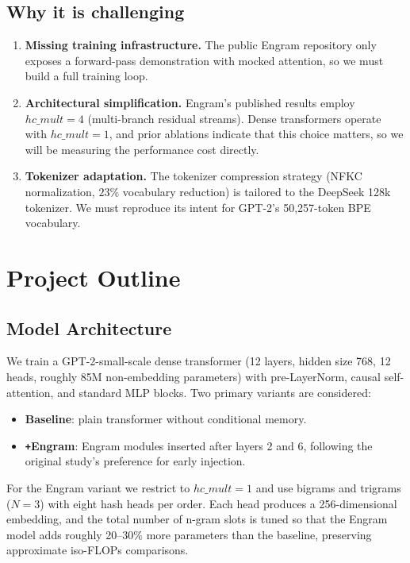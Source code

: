 \documentclass[11pt]{article}
\begin{document}
\subsection{Why it is challenging}
\begin{enumerate}
    \item \textbf{Missing training infrastructure.} The public Engram repository only exposes a forward-pass demonstration with mocked attention, so we must build a full training loop.
    \item \textbf{Architectural simplification.} Engram's published results employ $hc\_mult = 4$ (multi-branch residual streams). Dense transformers operate with $hc\_mult = 1$, and prior ablations indicate that this choice matters, so we will be measuring the performance cost directly.
    \item \textbf{Tokenizer adaptation.} The tokenizer compression strategy (NFKC normalization, $23\%$ vocabulary reduction) is tailored to the DeepSeek 128k tokenizer. We must reproduce its intent for GPT-2's 50{,}257-token BPE vocabulary.
\end{enumerate}

\section{Project Outline}
\subsection{Model Architecture}
We train a GPT-2-small-scale dense transformer (12 layers, hidden size 768, 12 heads, roughly 85M non-embedding parameters) with pre-LayerNorm, causal self-attention, and standard MLP blocks. Two primary variants are considered:
\begin{itemize}
    \item \textbf{Baseline}: plain transformer without conditional memory.
    \item \textbf{\texttt{+}Engram}: Engram modules inserted after layers 2 and 6, following the original study's preference for early injection.
\end{itemize}

For the Engram variant we restrict to $hc\_mult = 1$ and use bigrams and trigrams ($N=3$) with eight hash heads per order. Each head produces a 256-dimensional embedding, and the total number of n-gram slots is tuned so that the Engram model adds roughly 20--30\% more parameters than the baseline, preserving approximate iso-FLOPs comparisons.
\end{document}
